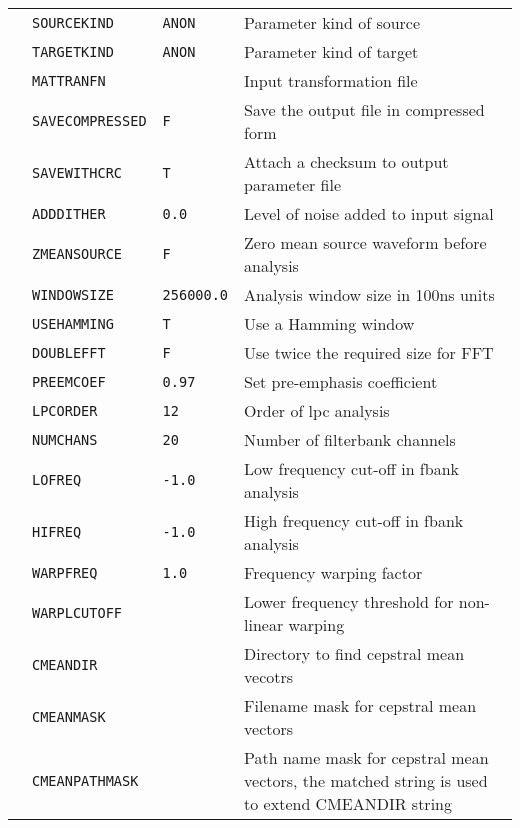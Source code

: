 \begin{center}
\begin{supertabular}{|p{1.8cm}|l|l|p{6.6cm}|}
  & \texttt{SOURCEKIND} & \texttt{ANON} & Parameter kind of source \\ 
  & \texttt{TARGETKIND} & \texttt{ANON} & Parameter kind of target \\ 
  & \texttt{MATTRANFN } &  & Input transformation file  \\ 
  & \texttt{SAVECOMPRESSED} & \texttt{F} & Save the output file in compressed form \\ 
  & \texttt{SAVEWITHCRC} & \texttt{T} & Attach a checksum to output parameter file \\ 
  & \texttt{ADDDITHER} & \texttt{0.0} & Level of noise added to input signal \\  
  & \texttt{ZMEANSOURCE} & \texttt{F} & Zero mean source waveform before analysis \\ 
  & \texttt{WINDOWSIZE} & \texttt{256000.0} & Analysis window size in 100ns units \\ 
  & \texttt{USEHAMMING} & \texttt{T} & Use a Hamming window \\ 
  & \texttt{DOUBLEFFT} & \texttt{F} & Use twice the required size for FFT \\ 
  & \texttt{PREEMCOEF} & \texttt{0.97} & Set pre-emphasis coefficient \\ 
  & \texttt{LPCORDER} &  \texttt{12} &  Order of lpc analysis \\ 
  & \texttt{NUMCHANS} & \texttt{20} & Number of filterbank channels \\ 
  & \texttt{LOFREQ} & \texttt{-1.0} & Low frequency cut-off in fbank analysis \\ 
  & \texttt{HIFREQ}  & \texttt{-1.0} & High frequency cut-off in fbank analysis \\  
  & \texttt{WARPFREQ} & \texttt{1.0} & Frequency warping factor \\ 
  & \texttt{WARPLCUTOFF} &  & Lower frequency threshold for non-linear warping  \\ 
  & \texttt{CMEANDIR} &  & Directory to find cepstral mean vecotrs  \\ 
  & \texttt{CMEANMASK} &  & Filename mask for cepstral mean vectors  \\ 
  & \texttt{CMEANPATHMASK} &  & Path name mask for cepstral mean vectors, the matched string is used to extend CMEANDIR string \\ 

\end{supertabular}
\end{center}
